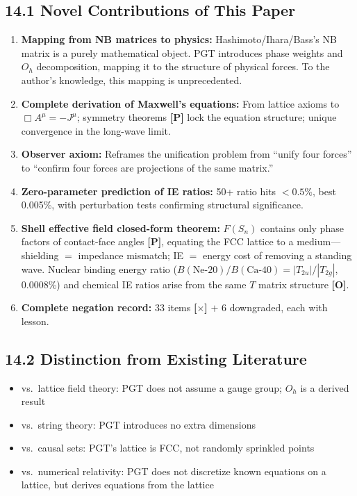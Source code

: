 \documentclass[11pt,a4paper]{article}
\newcommand{\gradeP}{\textbf{[P]}}
\newcommand{\gradeO}{\textbf{[O]}}
\newcommand{\gradeX}{\textbf{[$\times$]}}
\begin{document}
\subsection{14.1 Novel Contributions of This Paper}

\begin{enumerate}[nosep]
\item \textbf{Mapping from NB matrices to physics:} Hashimoto/Ihara/Bass's NB matrix is a purely mathematical object. PGT introduces phase weights and $O_h$ decomposition, mapping it to the structure of physical forces. To the author's knowledge, this mapping is unprecedented.
\item \textbf{Complete derivation of Maxwell's equations:} From lattice axioms to $\Box A^\mu=-J^\mu$; symmetry theorems \gradeP{} lock the equation structure; unique convergence in the long-wave limit.
\item \textbf{Observer axiom:} Reframes the unification problem from ``unify four forces'' to ``confirm four forces are projections of the same matrix.''
\item \textbf{Zero-parameter prediction of IE ratios:} 50+ ratio hits $<0.5\%$, best 0.005\%, with perturbation tests confirming structural significance.
\item \textbf{Shell effective field closed-form theorem:} $F(S_n)$ contains only phase factors of contact-face angles \gradeP, equating the FCC lattice to a medium---shielding $=$ impedance mismatch; IE $=$ energy cost of removing a standing wave. Nuclear binding energy ratio ($B(\text{Ne-20})/B(\text{Ca-40}) = |T_{2u}|/|T_{2g}|$, 0.0008\%) and chemical IE ratios arise from the same $T$ matrix structure \gradeO.
\item \textbf{Complete negation record:} 33 items \gradeX{} $+$ 6 downgraded, each with lesson.
\end{enumerate}

\subsection{14.2 Distinction from Existing Literature}

\begin{itemize}[nosep]
\item vs.\ lattice field theory: PGT does not assume a gauge group; $O_h$ is a derived result
\item vs.\ string theory: PGT introduces no extra dimensions
\item vs.\ causal sets: PGT's lattice is FCC, not randomly sprinkled points
\item vs.\ numerical relativity: PGT does not discretize known equations on a lattice, but derives equations from the lattice
\end{itemize}
\end{document}
